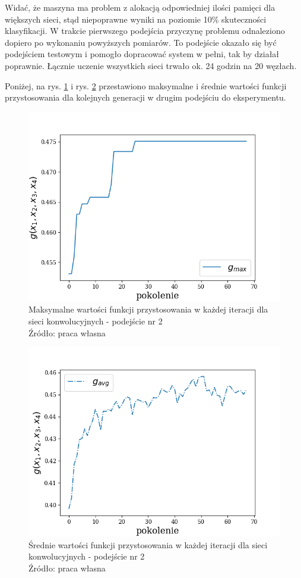 Widać, że maszyna ma problem z alokacją odpowiedniej ilości pamięci dla większych sieci, stąd niepoprawne wyniki na poziomie 10\% skuteczności klasyfikacji.
W trakcie pierwszego podejścia przyczynę problemu odnaleziono dopiero po wykonaniu powyższych pomiarów.
To podejście okazało się być podejściem testowym i pomogło dopracować system w pełni, tak by działał poprawnie.
Łącznie uczenie wszystkich sieci trwało ok. 24 godzin na 20 węzłach.

Poniżej, na rys. \ref{fig:cnn_maxes} i rys. \ref{fig:cnn_means} przestawiono maksymalne i średnie wartości funkcji przystosowania dla kolejnych generacji w drugim podejściu do eksperymentu.
\begin{figure}[h!tb]
	 \centering
	 \includegraphics[width = 0.9\linewidth]{img/cnn_maxes}
	 \caption{Maksymalne wartości funkcji przystosowania w każdej iteracji dla sieci konwolucyjnych - podejście nr 2\\
              Źródło: praca własna}
	 \label{fig:cnn_maxes}
\end{figure}

\begin{figure}[h!tb]
	 \centering
	 \includegraphics[width = 0.9\linewidth]{img/cnn_means}
	 \caption{Średnie wartości funkcji przystosowania w każdej iteracji dla sieci konwolucyjnych - podejście nr 2\\
              Źródło: praca własna}
	 \label{fig:cnn_means}
\end{figure}

